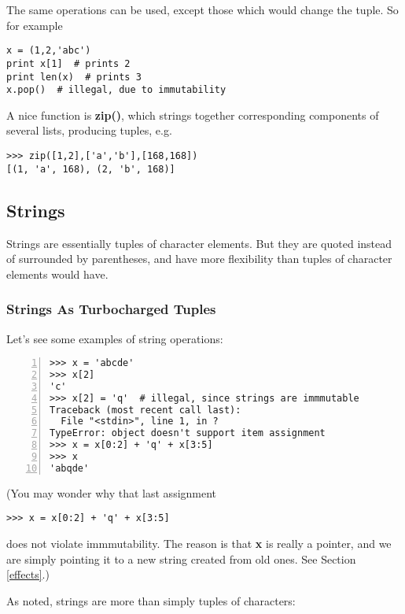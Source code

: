 The same operations can be used, except those which would change the tuple.
So for example 

\begin{Verbatim}[fontsize=\relsize{-2}]
x = (1,2,'abc') 
print x[1]  # prints 2
print len(x)  # prints 3
x.pop()  # illegal, due to immutability
\end{Verbatim}

A nice function is {\bf zip()}, which strings together corresponding
components of several lists, producing tuples, e.g.

\begin{Verbatim}[fontsize=\relsize{-2}]
>>> zip([1,2],['a','b'],[168,168])  
[(1, 'a', 168), (2, 'b', 168)]
\end{Verbatim}

\subsection{Strings}
\label{stringsec}

Strings are essentially tuples of character elements.  But they are
quoted instead of surrounded by parentheses, and have more flexibility
than tuples of character elements would have.  

\subsubsection{Strings As Turbocharged Tuples}

Let's see some examples of string operations:

\begin{Verbatim}[fontsize=\relsize{-2},numbers=left]
>>> x = 'abcde'
>>> x[2]
'c'
>>> x[2] = 'q'  # illegal, since strings are immmutable
Traceback (most recent call last):
  File "<stdin>", line 1, in ?
TypeError: object doesn't support item assignment
>>> x = x[0:2] + 'q' + x[3:5]
>>> x
'abqde'
\end{Verbatim}

(You may wonder why that last assignment 

\begin{Verbatim}[fontsize=\relsize{-2}]
>>> x = x[0:2] + 'q' + x[3:5]
\end{Verbatim}

does not violate immmutability.  The reason is that {\bf x} is really a
pointer, and we are simply pointing it to a new string created from old
ones.  See Section \ref{effects}.)

As noted, strings are more than simply tuples of characters: 

